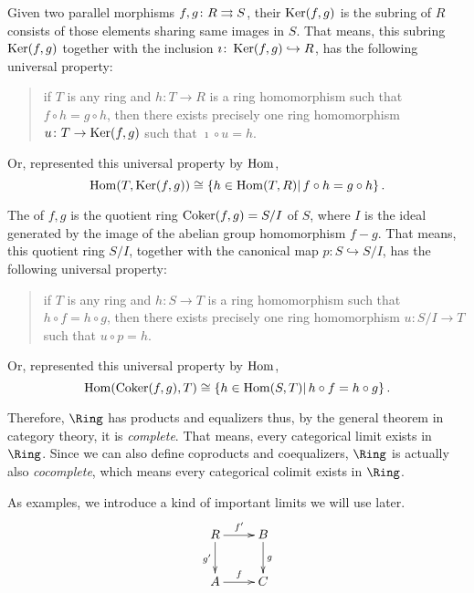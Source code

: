   Given two parallel morphisms $f,g\colon R\rightrightarrows S$, their  $\operatorname{Ker}(f,g)$ is the subring of $R$ consists of those elements sharing same images in $S$. That means, this subring $\operatorname{Ker}(f,g)$ together with the inclusion $\imath\colon \operatorname{Ker}(f,g) \hookrightarrow R$, has the following universal property:
  \begin{quote}
    if $T$ is any ring and $h\colon T\to R$ is a ring homomorphism such that $f\circ h = g\circ h$, then there exists precisely one ring homomorphism $u\colon T\to \operatorname{Ker}(f,g)$ such that $\imath\circ u = h$.
  \end{quote}
  Or, represented this universal property by $\operatorname{Hom}$,
  \begin{equation*}
    \operatorname{Hom}(T,\operatorname{Ker}(f,g)) \cong \left\{ h\in\operatorname{Hom}(T,R) \middle|\, f\circ h = g\circ h \right\}.
  \end{equation*}

  The  of $f,g$ is the quotient ring $\operatorname{Coker}(f,g)=S/I$ of $S$, where $I$ is the ideal generated by the image of the abelian group homomorphism $f-g$. That means, this quotient ring $S/I$, together with the canonical map $p\colon S\hookrightarrow S/I$, has the following universal property:
  \begin{quote}
    if $T$ is any ring and $h\colon S\to T$ is a ring homomorphism such that $h\circ f = h\circ g$, then there exists precisely one ring homomorphism $u\colon S/I\to T$ such that $u\circ p = h$.
  \end{quote}
  Or, represented this universal property by $\operatorname{Hom}$,
  \begin{equation*}
    \operatorname{Hom}(\operatorname{Coker}(f,g),T) \cong \left\{ h\in\operatorname{Hom}(S,T) \middle|\, h\circ f = h\circ g \right\}.
  \end{equation*}

  Therefore, $\Ring$ has products and equalizers thus, by the general theorem in category theory, it is \emph{complete}. That means, every categorical limit exists in $\Ring$. Since we can also define coproducts and coequalizers, $\Ring$ is actually also \emph{cocomplete}, which means every categorical colimit exists in $\Ring$.

  As examples, we introduce a kind of important limits we will use later.
    \begin{displaymath}
      \xymatrix{
         R\ar[r]^{f'}\ar[d]_{g'}&B\ar[d]^{g}\\
         A\ar[r]^{f}&C
      }
    \end{displaymath}

